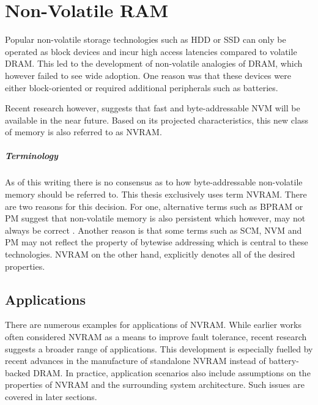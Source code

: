 \chapter{Non-Volatile RAM}
\label{ch:nvram}

Popular non-volatile storage technologies such as HDD or SSD can only be
operated as block devices and incur high access latencies compared to volatile
DRAM. This led to the development of non-volatile analogies of DRAM, which
however failed to see wide adoption. One reason was that these devices were
either block-oriented or required additional peripherals such as batteries.

Recent research however, suggests that fast and byte-addressable NVM will be
available in the near future. Based on its projected characteristics, this new
class of memory is also referred to as NVRAM.


\paragraph{Terminology}

As of this writing there is no consensus as to how byte-addressable non-volatile
memory should be referred to. This thesis exclusively uses term NVRAM. There are
two reasons for this decision. For one, alternative terms such as BPRAM or PM
suggest that non-volatile memory is also persistent which however, may not
always be correct . Another reason is that some terms such as SCM,
NVM and PM may not reflect the property of bytewise addressing which is central
to these technologies. NVRAM on the other hand, explicitly denotes all of the
desired properties.

\section{Applications}

There are numerous examples for applications of NVRAM. While earlier works often
considered NVRAM as a means to improve fault tolerance, recent research suggests
a broader range of applications. This development is especially fuelled by
recent advances in the manufacture of standalone NVRAM instead of battery-backed
DRAM. In practice, application scenarios also include assumptions on the
properties of NVRAM and the surrounding system architecture. Such issues are
covered in later sections.

